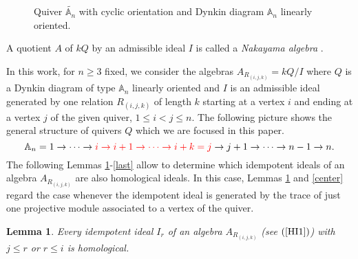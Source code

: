 \documentclass[10pt,twoside]{article}
\newtheorem{lema}{Lemma}
\theoremstyle{definition}
\begin{document}
\begin{figure}[H]
\begin{center}
\caption{Quiver $\widetilde{\mathbb{A}_n}$ with cyclic orientation and Dynkin diagram $\mathbb{A}_n$ linearly oriented.}
\end{center}
\end{figure}\label{Nakayama}


A quotient $A$ of $kQ$ by an admissible ideal $I$ is called a \textit{Nakayama algebra} \cite{Happel}.  
\par\smallskip

In this work, for $n\geq 3$ fixed, we consider the algebras $A_{R_{(i, j, k)}}=kQ/I$ where $Q$ is a Dynkin diagram of type $\mathbb{A}_{n}$ linearly oriented and $I$ is an admissible ideal generated by one relation $R_{(i, j, k)}$ of length $k$ starting at a vertex $i$ and ending at a vertex $j$ of the given quiver, $1\leq i<j \leq n$. The following picture shows the general structure of  quivers $Q$ which we are focused in this paper.
\[  \mathbb{A}_n=1 \to \cdots \to \color{red}i \to i+1  \to \cdots \to i+k=j \color{black}\to j+1 \to\cdots \to n-1 \to n.
\]
The following Lemmas \ref{homological}-\ref{last} allow to determine which idempotent ideals of an algebra $A_{R_{(i, j, k)}}$ are also homological ideals. In this case, Lemmas \ref{homological} and \ref{center} regard the case whenever the idempotent ideal is generated by the trace of just one projective module associated to a vertex of the quiver.  
\addtocounter{lema}{9}
\begin{lema}\label{homological}
Every idempotent ideal $I_r$ of an algebra $A_{R_{(i, j, k)}}$ (see $\mathrm{(\ref{HI1}})$) with $j\leq r$ or $r \leq i$  is homological.
\end{lema}
\end{document}
